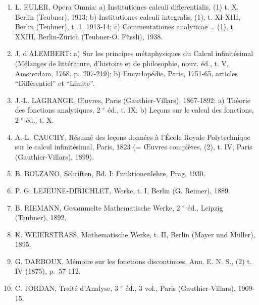 \begin{enumerate}
\def\labelenumi{(\Roman{enumi})}
\setcounter{enumi}{24}
\item
  L. EULER, Opera Omnia: a) Institutiones calculi differentialis, (1) t. X, Berlin (Teubner), 1913; b) Institutiones calculi integralis, (1), t. XI-XIII, Berlin (Teubner), t. 1, 1913-14; c) Commentationes analyticae \ldots{} (1), t. XXIII, Berlin-Zürich (Teubner-O. Füssli), 1938.
\item
  J. d'ALEMBERT: a) Sur les principes métaphysiques du Calcul infinitésimal (Mélanges de littérature, d'histoire et de philosophie, nouv. éd., t. V, Amsterdam, 1768, p.~207-219); b) Encyclopédie, Paris, 1751-65, articles ``Différentiel'' et ``Limite''.
\item
  J.-L. LAGRANGE, Œuvres, Paris (Gauthier-Villars), 1867-1892: a) Théorie des fonctions analytiques, 2 \(^{e}\) éd., t. IX; b) Leçons sur le calcul des fonctions, 2 \(^{e}\) éd., t. X.
\item
  A.-L. CAUCHY, Résumé des leçons données à l'École Royale Polytechnique sur le calcul infinitésimal, Paris, 1823 (= Œuvres complètes, (2), t. IV, Paris (Gauthier-Villars), 1899).
\item
  B. BOLZANO, Schriften, Bd. I: Funktionenlehre, Prag, 1930.
\item
  P. G. LEJEUNE-DIRICHLET, Werke, t. I, Berlin (G. Reimer), 1889.
\item
  B. RIEMANN, Gesammelte Mathematische Werke, 2 \(^{e}\) éd., Leipzig (Teubner), 1892.
\item
  K. WEIERSTRASS, Mathematische Werke, t. II, Berlin (Mayer und Müller), 1895.
\item
  G. DARBOUX, Mémoire sur les fonctions discontinues, Ann. E. N. S., (2) t. IV (1875), p.~57-112.
\item
  C. JORDAN, Traité d'Analyse, 3 \(^{e}\) éd., 3 vol., Paris (Gauthier-Villars), 1909-15.
\end{enumerate}

